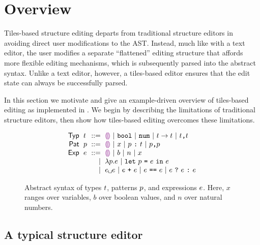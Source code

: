 \section{Overview}\label{sec:overview}

Tiles-based structure editing departs from traditional
structure editors in avoiding direct user modifications
to the AST.
Instead, much like with a text editor, the user modifies a separate
``flattened'' editing structure that affords more flexible
editing mechanisms, which is subsequently parsed into the
abstract syntax.
Unlike a text editor, however, a tiles-based editor ensures
that the edit state can always be successfully parsed.

In this section we motivate and give an example-driven
overview of tiles-based editing as implemented
in \tylr. We begin by describing the limitations of
traditional structure editors, then show how tiles-based
editing overcomes these limitations.


\begin{figure}
  \vspace{-3px}
  \[
  \arraycolsep=3pt\begin{array}{rlrl}
      \mathsf{Typ} & \styp & ::= &
          \shole ~\vert~
          \sbool ~\vert~
          \snum ~\vert~
          \sarr{\styp}{\styp} ~\vert~
          \sprod{\styp}{\styp}\\
      \mathsf{Pat} & \spat & ::= &
        \shole ~\vert~
        \svar{x} ~\vert~
        \sann{p}{\styp} ~\vert~
        \sprod{\spat}{\spat}\\
      \mathsf{Exp} & \sexp & ::= &
        \shole ~\vert~
        \sboollit{b} ~\vert~
        \snumlit{n} ~\vert~
        \svar{x} \\
      & & \vert &
        \slam{\spat}{\sexp} ~\vert~
        \slet{\spat}{\sexp}{\sexp}\\
      & & \vert &
        \sap{\sexp}{\sexp} ~\vert~
        \splus{\sexp}{\sexp} ~\vert~
        \sequals{\sexp}{\sexp} ~\vert~
        \scond{\sexp}{\sexp}{\sexp}
  \end{array}\]
  \caption{
    Abstract syntax of types $t$, patterns $p$, and expressions $e$.
    Here, $x$ ranges over variables, $b$ over boolean values, and $n$ over natural numbers.
  }
  \label{fig:language-syntax}
\end{figure}


\subsection{A typical structure editor} \label{sec:simple-editor}

